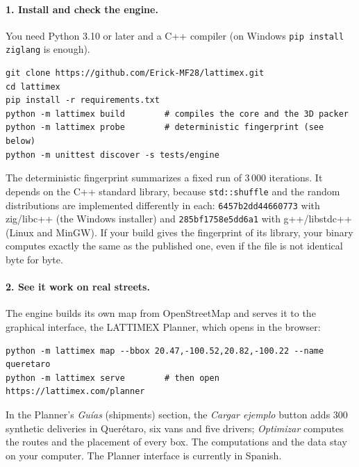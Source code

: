 \documentclass[11pt,a4paper]{article}
\newcommand{\tsl}[1]{\texttt{\small #1}}
\begin{document}
\paragraph{1. Install and check the engine.} You need Python 3.10 or later and a C++ compiler (on
Windows \tsl{pip install ziglang} is enough).
\begin{verbatim}
git clone https://github.com/Erick-MF28/lattimex.git
cd lattimex
pip install -r requirements.txt
python -m lattimex build        # compiles the core and the 3D packer
python -m lattimex probe        # deterministic fingerprint (see below)
python -m unittest discover -s tests/engine
\end{verbatim}
The deterministic fingerprint summarizes a fixed run of 3\,000 iterations. It depends on the C++
standard library, because \tsl{std::shuffle} and the random distributions are implemented
differently in each: \tsl{6457b2dd44660773} with zig/libc++ (the Windows installer) and
\tsl{285bf1758e5dd6a1} with g++/libstdc++ (Linux and MinGW). If your build gives the fingerprint of
its library, your binary computes exactly the same as the published one, even if the file is not
identical byte for byte.

\paragraph{2. See it work on real streets.} The engine builds its own map from OpenStreetMap and
serves it to the graphical interface, the LATTIMEX Planner, which opens in the browser:
\begin{verbatim}
python -m lattimex map --bbox 20.47,-100.52,20.82,-100.22 --name queretaro
python -m lattimex serve        # then open https://lattimex.com/planner
\end{verbatim}
In the Planner's \emph{Guías} (shipments) section, the \emph{Cargar ejemplo} button adds 300 synthetic
deliveries in Querétaro, six vans and five drivers; \emph{Optimizar} computes the routes and the
placement of every box. The computations and the data stay on your computer. The Planner interface is
currently in Spanish.
\end{document}
